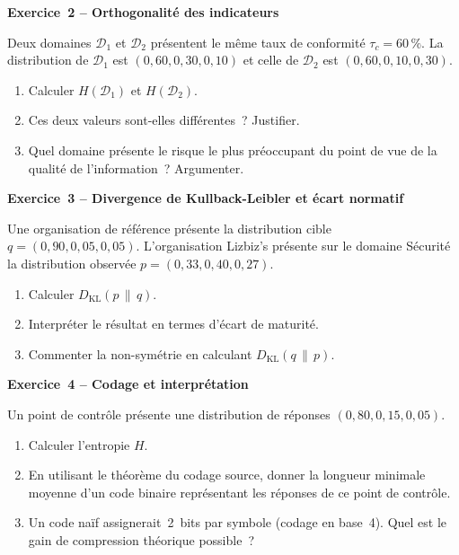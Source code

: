 \begin{boxexo}
\textbf{Exercice~2 – Orthogonalité des indicateurs}

Deux domaines $\mathcal{D}_1$ et $\mathcal{D}_2$ présentent le même taux de
conformité $\tau_c = 60\,\%$. La distribution de $\mathcal{D}_1$ est
$(0{,}60, 0{,}30, 0{,}10)$ et celle de $\mathcal{D}_2$ est $(0{,}60, 0{,}10, 0{,}30)$.

\begin{enumerate}[label=(\alph*)]
  \item Calculer $H(\mathcal{D}_1)$ et $H(\mathcal{D}_2)$.
  \item Ces deux valeurs sont-elles différentes~? Justifier.
  \item Quel domaine présente le risque le plus préoccupant du point de vue de
        la qualité de l'information~? Argumenter.
\end{enumerate}
\end{boxexo}

\begin{boxexo}
\textbf{Exercice~3 – Divergence de Kullback-Leibler et écart normatif}

Une organisation de référence présente la distribution cible
$q = (0{,}90, 0{,}05, 0{,}05)$. L'organisation Lizbiz's présente sur le domaine
Sécurité la distribution observée $p = (0{,}33, 0{,}40, 0{,}27)$.

\begin{enumerate}[label=(\alph*)]
  \item Calculer $D_{\mathrm{KL}}(p \,\|\, q)$.
  \item Interpréter le résultat en termes d'écart de maturité.
  \item Commenter la non-symétrie en calculant $D_{\mathrm{KL}}(q \,\|\, p)$.
\end{enumerate}
\end{boxexo}

\begin{boxexo}
\textbf{Exercice~4 – Codage et interprétation}

Un point de contrôle présente une distribution de réponses $(0{,}80, 0{,}15, 0{,}05)$.

\begin{enumerate}[label=(\alph*)]
  \item Calculer l'entropie $H$.
  \item En utilisant le théorème du codage source, donner la longueur minimale
        moyenne d'un code binaire représentant les réponses de ce point de
        contrôle.
  \item Un code naïf assignerait~2~bits par symbole (codage en base~4). Quel
        est le gain de compression théorique possible~?
\end{enumerate}
\end{boxexo}

